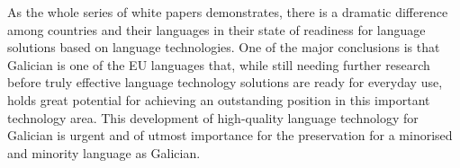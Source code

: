 \begin{multicols}{2}

As the whole series of white papers demonstrates, there is a dramatic difference among countries and their languages in their state of readiness for language solutions based on language technologies. One of the major conclusions is that Galician is one of the EU languages that, while still needing further research before truly effective language technology solutions are ready for everyday use, holds great potential for achieving an outstanding position in this important technology area. This development of high-quality language technology for Galician is urgent and of utmost importance for the preservation for a minorised and minority language as Galician.

    
\end{multicols}

\clearpage




